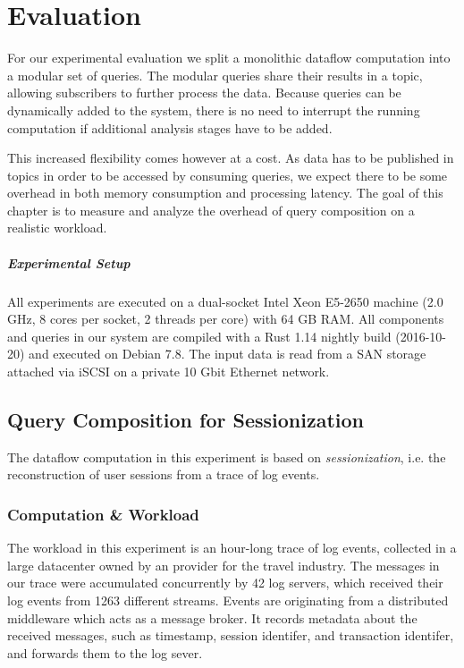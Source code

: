 \chapter{Evaluation}\label{ch:evaluation}

For our experimental evaluation we split a monolithic dataflow computation into a
modular set of queries. The modular queries share their results in a topic,
allowing subscribers to further process the data. Because queries
can be dynamically added to the system, there is no need to interrupt the
running computation if additional analysis stages have to be added.

This increased flexibility comes however at a cost. As data has to be published
in topics in order to be accessed by consuming queries, we expect there to be
some overhead in both memory consumption and processing latency. The goal
of this chapter is to measure and analyze the overhead of query composition
on a realistic workload.

\paragraph{Experimental Setup}

All experiments are executed on a dual-socket Intel Xeon E5-2650
machine (2.0 GHz, 8 cores per socket, 2 threads per core) with 64 GB RAM. All components and
queries in our system are compiled with a Rust 1.14 nightly build (2016-10-20)
and executed on Debian 7.8. The input data is read from a SAN storage attached
via iSCSI on a private 10 Gbit Ethernet network.

\section{Query Composition for Sessionization}

The dataflow computation in this experiment is based on \emph{sessionization},
i.e. the reconstruction of user sessions from a trace of log events.

\subsection{Computation \& Workload}

The workload in this experiment is an hour-long trace of log events, collected in
a large datacenter owned by an provider for the travel industry. The messages in our trace were
accumulated concurrently by 42 log servers, which received their log events from
1263 different streams. Events are originating from a distributed middleware which acts
as a message broker. It records metadata about the received messages, such as
timestamp, session identifer, and transaction identifer, and forwards them to
the log sever.

